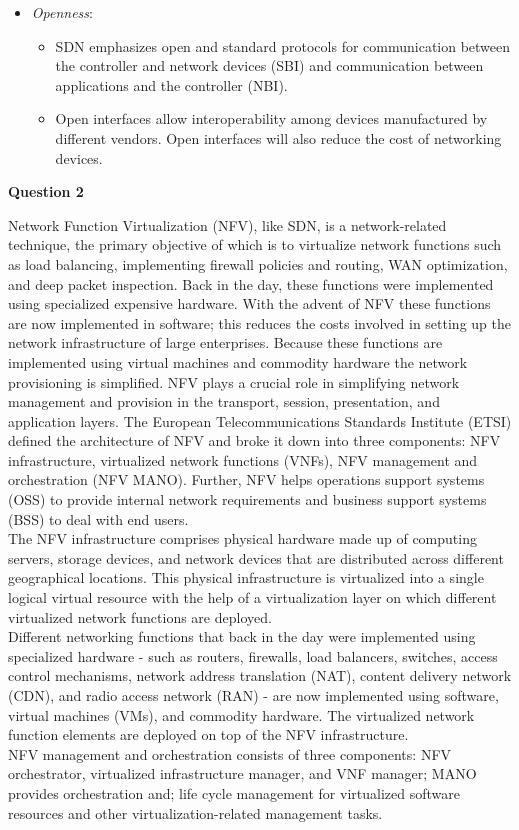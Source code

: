 \documentclass[a4paper, 12pt]{article}
\begin{document}
\begin{itemize}
\item
\textit{Openness}:
\begin{itemize}
\item
SDN emphasizes open and standard protocols for communication between the controller and network devices (SBI) and communication between applications and the controller (NBI).
\item
Open interfaces allow interoperability among devices manufactured by different vendors. Open interfaces will also reduce the cost of networking devices.
\end{itemize}
\end{itemize}

\newpage
\begin{center}
\textbf{Question 2}
\end{center}

Network Function Virtualization (NFV), like SDN, is a network-related technique, the primary objective of which is to virtualize network functions such as load balancing, implementing firewall policies and routing, WAN optimization, and deep packet inspection. Back in the day, these functions were implemented using specialized expensive hardware. With the advent of NFV these functions are now implemented in software; this reduces the costs involved in setting up the network infrastructure of large enterprises. Because these functions are implemented using virtual machines and commodity hardware the network provisioning is simplified. NFV plays a crucial role in simplifying network management and provision in the transport, session, presentation, and application layers. The European Telecommunications Standards Institute (ETSI) defined the architecture of NFV and broke it down into three components: NFV infrastructure, virtualized network functions (VNFs), NFV management and orchestration (NFV MANO). Further, NFV helps operations support systems (OSS) to provide internal network requirements and business support systems (BSS) to deal with end users.\\
\indent
The NFV infrastructure comprises physical hardware made up of computing servers, storage devices, and network devices that are distributed across different geographical locations. This physical infrastructure is virtualized into a single logical virtual resource with the help of a virtualization layer on which different virtualized network functions are deployed.\\
\indent
Different networking functions that back in the day were implemented using specialized hardware - such as routers, firewalls, load balancers, switches, access control mechanisms, network address translation (NAT), content delivery network (CDN), and radio access network (RAN) - are now implemented using software, virtual machines (VMs), and commodity hardware. The virtualized network function elements are deployed on top of the NFV infrastructure.\\
\indent
NFV management and orchestration consists of three components: NFV orchestrator, virtualized infrastructure manager, and VNF manager; MANO provides orchestration and; life cycle management for virtualized software resources and other virtualization-related management tasks.
\end{document}
